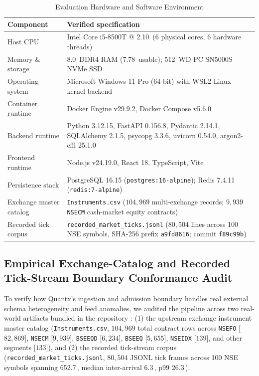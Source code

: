 \documentclass[12pt]{article}
\newcommand{\thinunit}[2]{#1\,\text{#2}}
\begin{document}
\begin{table}[!htbp]\begin{singlespace}
\caption{Evaluation Hardware and Software Environment}
\label{tab:env}
\centering
\small
\renewcommand{\arraystretch}{1.12}
\begin{tabularx}{\textwidth}{@{}>{\raggedright\arraybackslash}p{1.35in}X@{}}
\toprule
Component & Verified specification \\
\midrule
Host CPU & Intel Core i5-8500T @ \thinunit{2.10}{GHz} (6 physical cores, 6 hardware threads) \\
Memory \& storage & \thinunit{8.0}{GB} DDR4 RAM (\thinunit{7.78}{GB} usable); \thinunit{512}{GB} WD PC SN5000S NVMe SSD \\
Operating system & Microsoft Windows 11 Pro (64-bit) with WSL2 Linux kernel backend \\
Container runtime & Docker Engine v29.9.2, Docker Compose v5.6.0 \\
Backend runtime & Python 3.12.15, FastAPI 0.156.8, Pydantic 2.14.1, SQLAlchemy 2.1.5, psycopg 3.3.6, uvicorn 0.54.0, argon2-cffi 25.1.0 \\
Frontend runtime & Node.js v24.19.0, React 18, TypeScript, Vite \\
Persistence stack & PostgreSQL 16.15 (\texttt{postgres:16-alpine}); Redis 7.4.11 (\texttt{redis:7-alpine}) \\
Exchange master catalog & \texttt{Instruments.csv} ($104{,}969$ multi-exchange records; $9{,}939$ \texttt{NSECM} cash-market equity contracts) \cite{quantx_dataset} \\
Recorded tick corpus & \texttt{recorded\_market\_ticks.jsonl} ($80{,}504$ lines across 100 NSE symbols, SHA-256 prefix \texttt{a9fd8616}; commit \texttt{f89c99b}) \cite{quantx_dataset} \\
\bottomrule
\end{tabularx}
\end{singlespace}\end{table}

\subsection{Empirical Exchange-Catalog and Recorded Tick-Stream Boundary Conformance Audit}
To verify how Quantx's ingestion and admission boundary handles real external schema heterogeneity and feed anomalies, we audited the pipeline across two real-world artifacts bundled in the repository \cite{quantx_dataset}: (1) the upstream exchange instrument master catalog (\texttt{Instruments.csv}, $104{,}969$ total contract rows across \texttt{NSEFO} [$82{,}869$], \texttt{NSECM} [$9{,}939$], \texttt{BSEEQD} [$6{,}234$], \texttt{BSEEQ} [$5{,}655$], \texttt{NSEIDX} [$139$], and other segments [$133$]), and (2) the recorded tick-stream corpus (\texttt{recorded\_market\_ticks.jsonl}, $80{,}504$ JSONL tick frames across 100 NSE symbols spanning \thinunit{652.7}{s}, median inter-arrival \thinunit{6.3}{ms}, p99 \thinunit{26.3}{ms}).
\end{document}
